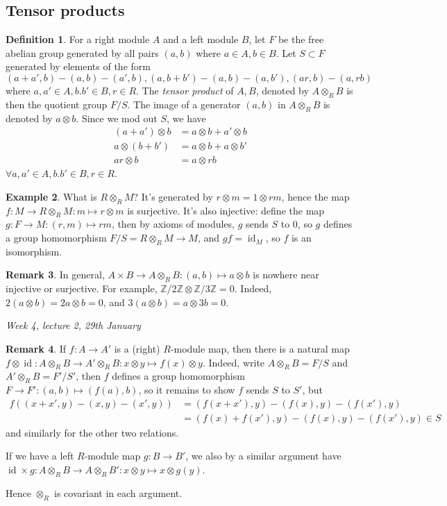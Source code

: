 \documentclass{article}
\newcommand{\Z}{\mathbb{Z}}
\newcommand{\id}{\operatorname{id}}
\theoremstyle{definition}
\newtheorem{defn}{Definition}[subsection]
\newtheorem{example}[defn]{Example}
\newtheorem{remark}[defn]{Remark}
\begin{document}
\subsection{Tensor products}
\begin{defn}
For a right module $A$ and a left module $B$, let $F$ be the free abelian group generated by all pairs $(a,b)$ where $a\in A,b\in B$. Let $S\subset F$ generated by elements of the form $(a+a',b)-(a,b)-(a',b),(a,b+b')-(a,b)-(a,b'),(ar,b)-(a,rb)$ where $a,a'\in A,b.b'\in B,r\in R$. The \textit{tensor product} of $A,B$, denoted by $A\otimes_RB$ is then the quotient group $F/S$. The image of a generator $(a,b)$ in $A\otimes_RB$ is denoted by $a\otimes b$. Since we mod out $S$, we have
\[
\begin{aligned}
(a+a')\otimes b&=a\otimes b+a'\otimes b\\
a\otimes (b+b')&=a\otimes b+a\otimes b'\\
ar\otimes b&=a\otimes rb
\end{aligned}
\]
$\forall a,a'\in A,b.b'\in B,r\in R$.
\end{defn}

\begin{example}
What is $R\otimes_RM$? It's generated by $r\otimes m=1\otimes rm$, hence the map $f:M\rightarrow R\otimes_RM:m\mapsto r\otimes m$ is surjective. It's also injective: define the map $g:F\rightarrow M:(r,m)\mapsto rm$, then by axioms of modules, $g$ sends $S$ to 0, so $g$ defines a group homomorphism $F/S=R\otimes_RM\rightarrow M$, and $gf=\id_M$, so $f$ is an isomorphism.
\end{example}

\begin{remark}
\label{remark:tensorprodeasilyvan}
In general, $A\times B\rightarrow A\otimes_RB:(a,b)\mapsto a\otimes b$ is nowhere near injective or surjective. For example, $\Z/2\Z\otimes\Z/3\Z=0$. Indeed, $2(a\otimes b)=2a\otimes b=0$, and $3(a\otimes b)=a\otimes 3b=0$.
\end{remark}

\begin{flushright}
\textit{Week 4, lecture 2, 29th January}
\end{flushright}

\begin{remark}
If $f:A\rightarrow A'$ is a (right) $R$-module map, then there is a natural map $f\otimes\id:A\otimes_RB\rightarrow A'\otimes_RB:x\otimes y\mapsto f(x)\otimes y$. Indeed, write $A\otimes_RB=F/S$ and $A'\otimes_RB=F'/S'$, then $f$ defines a group homomorphism $F\rightarrow F':(a,b)\mapsto (f(a),b)$, so it remains to show $f$ sends $S$ to $S'$, but
\[
\begin{aligned}
f((x+x',y)-(x,y)-(x',y))&=(f(x+x'),y)-(f(x),y)-(f(x'),y)\\&=(f(x)+f(x'),y)-(f(x),y)-(f(x'),y)\in S
\end{aligned}
\]
and similarly for the other two relations.

If we have a left $R$-module map $g:B\rightarrow B'$, we also by a similar argument have $\id\times g:A\otimes_RB\rightarrow A\otimes_RB':x\otimes y\mapsto x\otimes g(y)$.

Hence $\otimes_R$ is covariant in each argument.
\end{remark}
\end{document}
